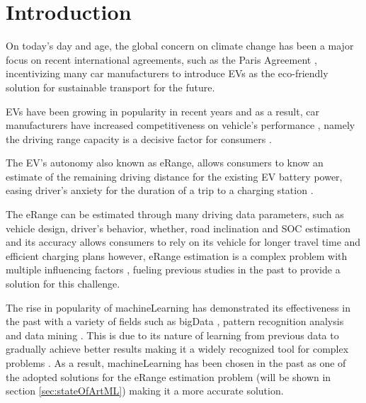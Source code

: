 \chapter{Introduction}
\label{cha:introduction}

On today's day and age, the global concern on climate
change has been a major focus on recent international agreements,
such as the Paris Agreement \citep{parisAgreement},
incentivizing many car manufacturers to introduce
\glspl{EV} as the eco-friendly
solution for sustainable transport for the future.

\glspl{EV} have been growing in popularity in
recent years and as a result, car manufacturers have
increased competitiveness on vehicle's performance
\citep{evCompetitiveness}, namely the driving range 
capacity is a decisive factor for consumers \citep{EGBUE2012717}.

The \gls{EV}'s autonomy also known as \gls{eRange},
allows consumers to know an estimate of the
remaining driving distance for the existing \gls{EV}
battery power, easing driver's anxiety for the duration
of a trip to a charging station \citep{eRangeFactors, driverAnxiety}.

The \gls{eRange} can be estimated through many
driving data parameters,
such as vehicle design, driver's behavior, whether,
road inclination and \gls{SOC} estimation and its
accuracy allows consumers to rely
on its vehicle for longer travel time and efficient
charging plans however, \gls{eRange} estimation
is a complex problem with multiple influencing
factors \citep{predictionOfeRange}, fueling previous
studies in the past to provide a solution for this challenge.

The rise in popularity of \gls{machineLearning}
\citep{machineLearningCaseStudy}
has demonstrated its effectiveness in the
past with a variety of fields such as \gls{bigData}
\citep{machineLearningBigData, machineLearningBigData2},
pattern recognition analysis and data mining
\citep{businessDataMining}.  
This is due to its nature of learning 
from previous data to gradually achieve
better results making it a widely 
recognized tool for complex problems 
\citep{mitchelllearning}.
As a result, \gls{machineLearning}
has been chosen in the past 
as one of the adopted solutions for 
the \gls{eRange} estimation problem 
(will be shown in section \ref{sec:stateOfArtML})
making it a more accurate solution.  

